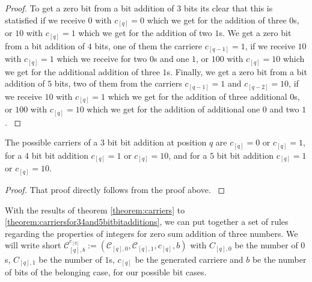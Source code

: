 \begin{proof}
    To get a zero bit from a bit addition of $3$ bits its clear that this is statisfied if we receive $0$ with $c_{[q]} = 0$ which we get for the addition of three $0$s, or $10$ with $c_{[q]} = 1$ which we get for the addition of two $1$s. We get a zero bit from a bit addition of $4$ bits, one of them the carriere $c_{[q-1]} = 1$, if we receive $10$ with $c_{[q]} = 1$ which we receive for two $0$s and one $1$, or $100$ with $c_{[q]} = 10$ which we get for the additional addition of three $1$s. Finally, we get a zero bit from a bit addition of $5$ bits, two of them from the carriers $c_{[q-1]} = 1$ and $c_{[q-2]} = 10$, if we receive $10$ with $c_{[q]} = 1$ which we get for the addition of three additional $0$s, or $100$ with $c_{[q]} = 10$ which we get for the addition of additional one $0$ and two $1$.
\label{proof:numberof0sand1sinintegersforzerosum}
\end{proof}


\begin{theorem}
    The possible carriers of a $3$ bit bit addition at position $q$ are $c_{[q]} = 0$ or $c_{[q]} = 1$, for a $4$ bit bit addition $c_{[q]} = 1$ or $c_{[q]} = 10$, and for a $5$ bit bit addition $c_{[q]} = 1$ or $c_{[q]} = 10$.
\label{theorem:carriersfor34and5bitbitadditions}
\end{theorem}

\begin{proof}
    That proof directly follows from the proof above.
\label{proof:carriersfor34and5bitbitadditions}
\end{proof}

With the results of theorem \ref{theorem:carriers} to \ref{theorem:carriersfor34and5bitbitadditions}, we can put together a set of rules regarding the properties of integers for zero sum addition of three numbers. We will write short $\mathcal{C}^{c_{[q]}}_{[q],b} := \left(\mathcal{C}_{[q],0}, \mathcal{C}_{[q],1}, c_{[q]}, b\right)$ with $C_{[q],0}$ be the number of $0$s, $C_{[q],1}$ be the number of $1$s, $c_{[q]}$ be the generated carriere and $b$ be the number of bits of the belonging case, for our possible bit cases.

